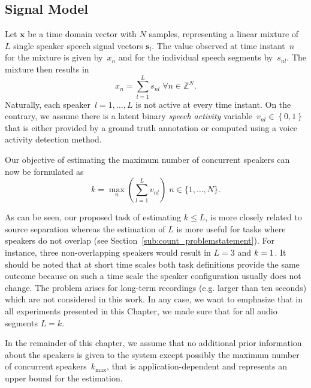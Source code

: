 \subsection{Signal Model}%
\label{ssec:signal_model}
Let \(\mathbf{x}\) be a time domain vector with \(N\) samples, representing a linear mixture of \(L\) single speaker speech signal vectors \(\mathbf{s}_l\).
The value observed at time instant~\(n\) for the mixture is given by~$x_n$ and for the individual speech segments by~$s_{nl}$.
The mixture then results in
%
\begin{equation}
  x_n = \sum_{l=1}^{L}{s_{nl}} \; \forall n \in \mathbb{Z}^N.
  \label{eq:mixing_model}
\end{equation}
%
Naturally, each speaker~$l=1,\dots,L$ is not active at every time instant.
On the contrary, we assume there is a latent binary \textit{speech activity} variable~$v_{nl}\in \left\{ 0,1 \right\}$ that is either provided by a ground truth annotation or computed using a voice activity detection method.

Our objective of estimating the maximum number of concurrent speakers can now be formulated as
%
\begin{equation}
k=\underset{n}{\max}\left(\sum_{l = 1}^{L} v_{nl}\right) \; n \in \{ 1,\ldots, N \}
\label{eq:definition_k}.
\end{equation}

As can be seen, our proposed task of estimating $k\leq L$, is more closely related to source separation whereas the estimation of \(L\) is more useful for tasks where speakers do not overlap (see Section~\ref{sub:count_problemstatement}).
For instance, three non-overlapping speakers would result in \(L = 3\) and \(k = 1\).
It should be noted that at short time scales both task definitions provide the same outcome because on such a time scale the speaker configuration usually does not change. The problem arises for long-term recordings (e.g. larger than ten seconds) which are not considered in this work.
In any case, we want to emphasize that in all experiments presented in this Chapter, we made sure that for all audio segments $L = k$.
\par
In the remainder of this chapter, we assume that no additional prior information about the speakers is given to the system except possibly the maximum number of concurrent speakers~$k_{\max}$, that is application-dependent and represents an upper bound for the estimation.


